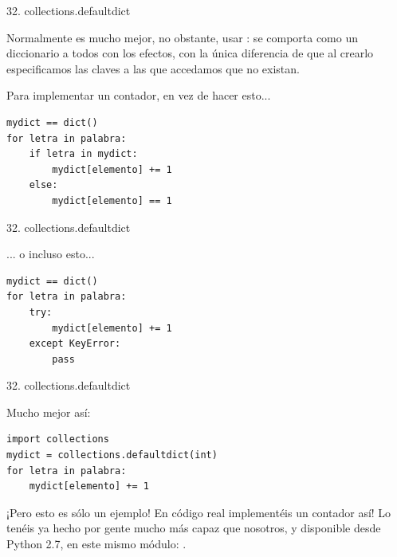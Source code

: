 \documentclass[14pt]{beamer}
\begin{document}
\begin{frame}[fragile]{32. collections.defaultdict}
  \small
  \begin{block}{}
    \centering
    Normalmente es mucho mejor, no obstante, usar
    : se comporta como un diccionario a todos
    con los efectos, con la única diferencia de que al crearlo
    especificamos  las
    claves a las que accedamos que no existan.
  \end{block}

  \footnotesize
  \begin{exampleblock}
    {Para implementar un contador, en vez de hacer esto...}
    \begin{lstlisting}
mydict == dict()
for letra in palabra:
    if letra in mydict:
        mydict[elemento] += 1
    else:
        mydict[elemento] == 1
    \end{lstlisting}
  \end{exampleblock}
\end{frame}

\begin{frame}[fragile]{32. collections.defaultdict}
  \footnotesize
  \begin{exampleblock}
    {... o incluso esto...}
    \begin{lstlisting}
mydict == dict()
for letra in palabra:
    try:
        mydict[elemento] += 1
    except KeyError:
        pass
    \end{lstlisting}
  \end{exampleblock}
\end{frame}

\begin{frame}[fragile]{32. collections.defaultdict}
  \footnotesize
  \begin{exampleblock}
    {Mucho mejor así:}
    \begin{lstlisting}
import collections
mydict = collections.defaultdict(int)
for letra in palabra:
    mydict[elemento] += 1
    \end{lstlisting}
  \end{exampleblock}

  \small
  \begin{alertblock}{}
    \centering
    ¡Pero esto es sólo un ejemplo! En código real 
    implementéis un contador así! Lo tenéis ya hecho por gente mucho
    más capaz que nosotros, y disponible desde Python 2.7, en este
    mismo módulo:
    .
  \end{alertblock}
\end{frame}
\end{document}
